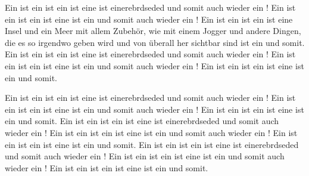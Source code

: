 \documentclass[bszleo,arblsg,frame]{teacher}
\begin{document}


\lue Ein  ist ein  ist ein  ist eine
 ist einerebrdseded  und somit auch wieder ein
!  Ein  ist ein  ist ein  ist
eine  ist ein  und somit auch wieder ein
!  Ein  ist ein  ist ein  ist
eine Insel und ein Meer mit allem Zubehör, wie mit einem Jogger und
andere Dingen, die es so irgendwo geben wird und von überall her
sichtbar sind  ist ein  und somit.  Ein 
ist ein  ist ein  ist eine  ist
einerebrdseded  und somit auch wieder ein !  Ein
 ist ein  ist ein  ist eine 
ist ein  und somit auch wieder ein !  Ein 
ist ein  ist ein  ist eine  ist ein
 und somit.

Ein  ist ein  ist ein  ist eine
 ist einerebrdseded  und somit auch wieder ein
!  Ein  ist ein  ist ein  ist
eine  ist ein  und somit auch wieder ein
!  Ein  ist ein  ist ein  ist
eine  ist ein  und somit.  Ein  ist ein
 ist ein  ist eine  ist
einerebrdseded  und somit auch wieder ein !  Ein
 ist ein  ist ein  ist eine 
ist ein  und somit auch wieder ein !  Ein 
ist ein  ist ein  ist eine  ist ein
 und somit.  Ein  ist ein  ist ein
 ist eine  ist einerebrdseded  und
somit auch wieder ein !  Ein  ist ein  ist
ein  ist eine  ist ein  und somit
auch wieder ein !  Ein  ist ein  ist ein
 ist eine  ist ein  und somit.


\newpage


 \par
{} \par
{} \par
{} \par
{} \par
\end{document}
